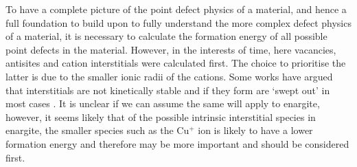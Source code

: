 \documentclass[11pt, twoside]{report}
\begin{document}
To have a complete picture of the point defect physics of a material, and hence a full foundation to build upon to fully understand the more complex defect physics of a material, it is necessary to calculate the formation energy of all possible point defects in the material. However, in the interests of time, here vacancies, antisites and cation interstitials were calculated first. The choice to prioritise the latter is due to the smaller ionic radii of the cations.
Some works have argued that interstitials are not kinetically stable and if they form are `swept out' in most cases \cite{defect_kinetics}. It is unclear if we can assume the same will apply to enargite, however, it seems likely that of the possible intrinsic interstitial species in enargite, the smaller species such as the Cu$^{+}$ ion is likely to have a lower formation energy and therefore may be more important and should be considered first.
\end{document}
